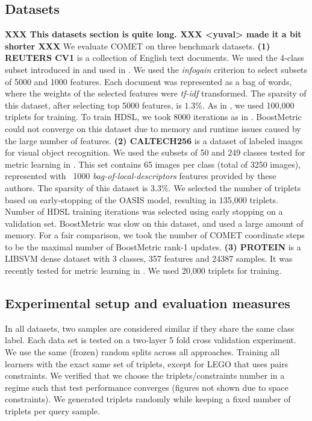 \documentclass[twoside,11pt]{article}
\begin{document}
\subsection{Datasets}\vskip -5pt  {\bf XXX This datasets section is quite long. XXX <yuval> made it a bit shorter XXX}
We evaluate COMET on three benchmark datasets.
\noindent \textbf{(1) REUTERS CV1} is a collection of English text documents. We used the 4-class subset introduced in \citep{CaiRCV14} and used in \citep{HDSL}. We used the \textit{infogain} criterion \citep{infogain} to select subsets of 5000 and 1000 features. Each document was represented as a bag of words, where the weights of the selected features were \textit{tf-idf} transformed. The sparsity of this dataset, after selecting top 5000 features, is $1.3\%$. As in \citet{HDSL}, we used 100,000 triplets for training. To train HDSL, we took 8000 iterations as in \citep{HDSL}. BoostMetric could not converge on this dataset due to memory and runtime issues caused by the large number of features. \textbf{(2) CALTECH256} is a dataset of labeled images for visual object recognition. We used the subsets of 50 and 249 classes tested for metric learning in \citep{OASIS}. This set contains 65 images per class (total of 3250 images), represented with ~1000 \textit{bag-of-local-descriptors} features provided by these authors. The sparsity of this dataset is $3.3\%$. We selected the number of triplets based on early-stopping of the OASIS model, resulting in 
135,000 triplets. Number of HDSL training iterations was selected using early stopping on a validation set. BoostMetric was slow on this dataset, and used a large amount of memory. For a fair comparison, we took the number of COMET coordinate steps to be the maximal number of BoostMetric rank-1 updates. \textbf{(3) PROTEIN} is a LIBSVM \citep{libsvm} dense dataset with 3 classes, 357 features and 24387 samples. It was recently tested for metric learning in \citep{qian}. We used 20,000 triplets for training.


\vspace{-6pt}
\subsection{Experimental setup and evaluation measures}
\vskip -5pt
In all datasets, two samples are considered similar if they share the same class label. Each data set is tested on a two-layer 5 fold cross validation experiment. We use the same (frozen) random splits across all approaches. Training all learners with the exact same set of triplets, except for LEGO that uses pairs constraints. We verified that we choose the triplets/constraints number in a regime such that test performance converges (figures not shown due to space constraints). We generated triplets randomly while keeping a fixed number of triplets per query sample.
\end{document}
